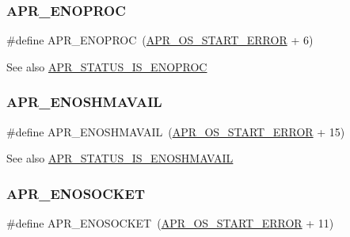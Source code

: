 \subsubsection{\texorpdfstring{A\+P\+R\+\_\+\+E\+N\+O\+P\+R\+OC}{APR\_ENOPROC}}
{\footnotesize\ttfamily \#define A\+P\+R\+\_\+\+E\+N\+O\+P\+R\+OC~(\mbox{\hyperlink{group__apr__errno_ga191894048b7bd0cca3cf0bdff1eb695b}{A\+P\+R\+\_\+\+O\+S\+\_\+\+S\+T\+A\+R\+T\+\_\+\+E\+R\+R\+OR}} + 6)}

\begin{DoxySeeAlso}{See also}
\mbox{\hyperlink{group___a_p_r___s_t_a_t_u_s___i_s_ga566f4c9b9db8a0c31199a938bdc4e38a}{A\+P\+R\+\_\+\+S\+T\+A\+T\+U\+S\+\_\+\+I\+S\+\_\+\+E\+N\+O\+P\+R\+OC}} 
\end{DoxySeeAlso}
\mbox{\label{group___a_p_r___error_ga67516f4e87197490333480a8bbc78725}} 
\subsubsection{\texorpdfstring{A\+P\+R\+\_\+\+E\+N\+O\+S\+H\+M\+A\+V\+A\+IL}{APR\_ENOSHMAVAIL}}
{\footnotesize\ttfamily \#define A\+P\+R\+\_\+\+E\+N\+O\+S\+H\+M\+A\+V\+A\+IL~(\mbox{\hyperlink{group__apr__errno_ga191894048b7bd0cca3cf0bdff1eb695b}{A\+P\+R\+\_\+\+O\+S\+\_\+\+S\+T\+A\+R\+T\+\_\+\+E\+R\+R\+OR}} + 15)}

\begin{DoxySeeAlso}{See also}
\mbox{\hyperlink{group___a_p_r___s_t_a_t_u_s___i_s_ga99af86378a3ac8eb5a59f1acffec6440}{A\+P\+R\+\_\+\+S\+T\+A\+T\+U\+S\+\_\+\+I\+S\+\_\+\+E\+N\+O\+S\+H\+M\+A\+V\+A\+IL}} 
\end{DoxySeeAlso}
\mbox{\label{group___a_p_r___error_ga99e125e203a1d44f12bd88b41696716d}} 
\subsubsection{\texorpdfstring{A\+P\+R\+\_\+\+E\+N\+O\+S\+O\+C\+K\+ET}{APR\_ENOSOCKET}}
{\footnotesize\ttfamily \#define A\+P\+R\+\_\+\+E\+N\+O\+S\+O\+C\+K\+ET~(\mbox{\hyperlink{group__apr__errno_ga191894048b7bd0cca3cf0bdff1eb695b}{A\+P\+R\+\_\+\+O\+S\+\_\+\+S\+T\+A\+R\+T\+\_\+\+E\+R\+R\+OR}} + 11)}

